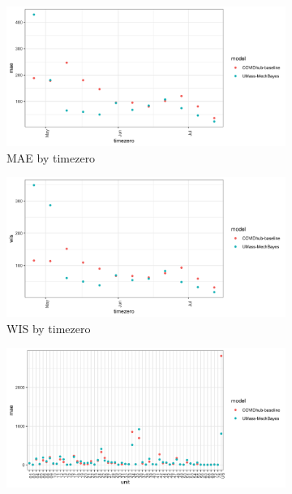 \documentclass[11pt]{amsart}
\begin{document}
\begin{figure}
  \centering
     \begin{subfigure}{.5\textwidth}
  \centering
    \includegraphics[scale=.1]{mae_results_by_time_zero.png}
    \caption{MAE by timezero}
\end{subfigure}%
\begin{subfigure}{.5\textwidth}
  \centering
    \includegraphics[scale=.1]{wis_results_by_time_zero.png}
    \caption{WIS by timezero}
\end{subfigure}
\begin{subfigure}{.5\textwidth}
  \centering
    \includegraphics[scale=.1]{mae_results_by_region.png}

\end{subfigure}
\end{figure}
\end{document}
